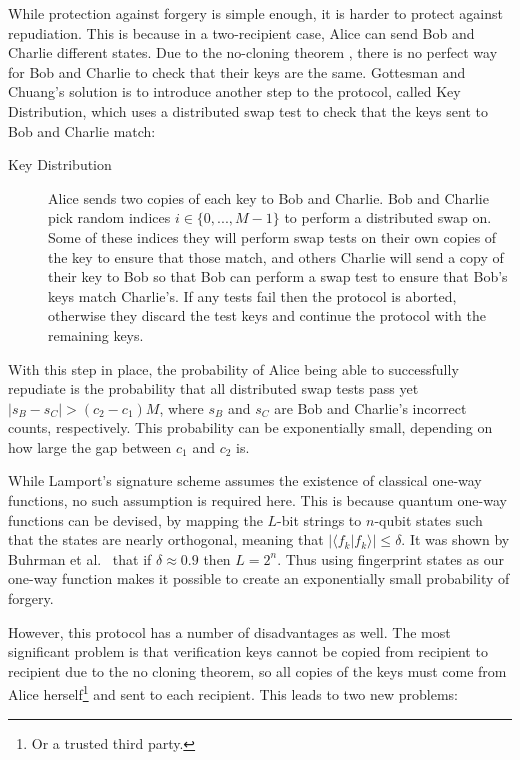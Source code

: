 \documentclass[%
 reprint,
 amsmath,amssymb,
 aps,
 pra,
]{revtex4-1}
\begin{document}
While protection against forgery is simple enough, it is harder to protect against repudiation. This is because in a two-recipient case, Alice can send Bob and Charlie different states. Due to the no-cloning theorem \cite{WZ82}, there is no perfect way for Bob and Charlie to check that their keys are the same. Gottesman and Chuang's solution is to introduce another step to the protocol, called Key Distribution, which uses a distributed swap test to check that the keys sent to Bob and Charlie match:

\begin{description}
\item[Key Distribution]Alice sends two copies of each key to Bob and Charlie. Bob and Charlie pick random indices $i \in \{0,...,M-1\}$ to perform a distributed swap on. Some of these indices they will perform swap tests on their own copies of the key to ensure that those match, and others Charlie will send a copy of their key to Bob so that Bob can perform a swap test to ensure that Bob's keys match Charlie's. If any tests fail then the protocol is aborted, otherwise they discard the test keys and continue the protocol with the remaining keys.
\end{description}

With this step in place, the probability of Alice being able to successfully repudiate is the probability that all distributed swap tests pass yet $|s_B - s_C| > (c_2 - c_1)M$, where $s_B$ and $s_C$ are Bob and Charlie's incorrect counts, respectively. This probability can be exponentially small, depending on how large the gap between $c_1$ and $c_2$ is.

While Lamport's signature scheme assumes the existence of classical one-way functions, no such assumption is required here. This is because quantum one-way functions can be devised, by mapping the $L$-bit strings to $n$-qubit states such that the states are nearly orthogonal, meaning that $|\langle f_k|f_k \rangle| \leq \delta$. It was shown by Buhrman et al.~\cite{PhysRevLett.87.167902} that if $\delta \approx 0.9$ then $L = 2^n$. Thus using fingerprint states as our one-way function makes it possible to create an exponentially small probability of forgery.

However, this protocol has a number of disadvantages as well. The most significant problem is that verification keys cannot be copied from recipient to recipient due to the no cloning theorem, so all copies of the keys must come from Alice herself\footnote{Or a trusted third party.} and sent to each recipient. This leads to two new problems:
\end{document}
